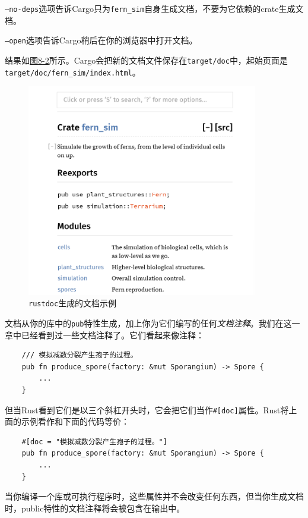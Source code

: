 \texttt{--no-deps}选项告诉Cargo只为\texttt{fern\_sim}自身生成文档，不要为它依赖的crate生成文档。

\texttt{--open}选项告诉Cargo稍后在你的浏览器中打开文档。

结果如\hyperref[f8-2]{图8-2}所示。Cargo会把新的文档文件保存在\texttt{target/doc}中，起始页面是\texttt{target/doc/fern\_sim/index.html}。

\begin{figure}[htbp]
    \centering
    \includegraphics[width=0.9\textwidth]{../img/f8-2.png}
    \caption{\texttt{rustdoc}生成的文档示例}
    \label{f8-2}
\end{figure}

文档从你的库中的\texttt{pub}特性生成，加上你为它们编写的任何\emph{文档注释}。我们在这一章中已经看到过一些文档注释了。它们看起来像注释：
\begin{verbatim}
    /// 模拟减数分裂产生孢子的过程。
    pub fn produce_spore(factory: &mut Sporangium) -> Spore {
        ...
    }
\end{verbatim}
但当Rust看到它们是以三个斜杠开头时，它会把它们当作\texttt{\#[doc]}属性。Rust将上面的示例看作和下面的代码等价：
\begin{verbatim}
    #[doc = "模拟减数分裂产生孢子的过程。"]
    pub fn produce_spore(factory: &mut Sporangium) -> Spore {
        ...
    }
\end{verbatim}

当你编译一个库或可执行程序时，这些属性并不会改变任何东西，但当你生成文档时，public特性的文档注释将会被包含在输出中。

